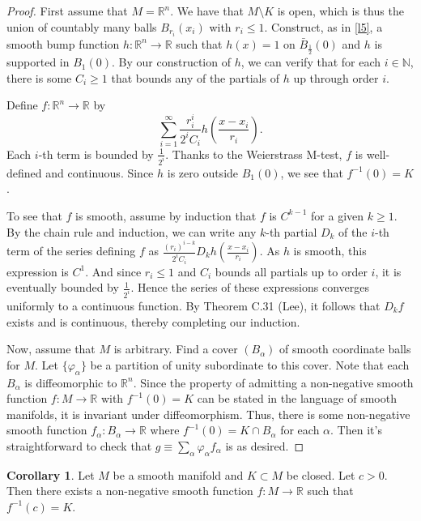 \documentclass[10pt,letterpaper,cm]{nupset}
\theoremstyle{definition}
\theoremstyle{theorem}
\newtheorem{corollary}[definition]{Corollary}
\theoremstyle{remark}
\newcommand{\N}{\mathbb N}
\newcommand{\R}{\mathbb R}
\newcommand{\1}{\mathbf{1}}
\newcommand{\0}{\vec 0}
\begin{document}
\begin{proof}
First assume that $M=\R^n$. We have that $M\setminus K$ is open, which is thus the union of countably many balls $B_{r_i}(x_i)$ with $r_i \leq 1$. Construct, as in \cref{l5}, a smooth bump function $h: \R^n \to \R$ such that
 $h(x) =1$ on $\bar{B}_{\frac{1}{2}}(0)$ and  $h$ is supported in $B_1(0)$.  By our construction of $h$, we can verify that for each $i\in \N$, there is some $C_i \geq 1$ that bounds any of the partials of $h$ up through order $i$. 

 Define $f: \R^n \to \R$ by $$\sum_{i=1}^\infty \frac{r_i^i}{2^iC_i}h \left(\frac{x-x_i}{r_i}\right).$$ Each $i$-th term is bounded by $\frac{1}{2^i}$. Thanks to the Weierstrass M-test, $f$ is well-defined and continuous. Since $h$ is zero outside $B_1(0)$, we see that $f^{-1}(0) = K$. 
 
 To see that $f$ is smooth, assume by induction that $f$ is $C^{k-1}$ for a given $k \geq 1$. By the chain rule and induction, we can write any $k$-th partial $D_k$ of the $i$-th term of the series defining $f$ as $\frac{(r_i)^{i-k}}{2^iC_i} D_kh(\frac{x-x_i}{r_i})$. As $h$ is smooth, this expression is $C^1$. And since $r_i \leq 1$ and $C_i$ bounds all partials up to order $i$, it is eventually bounded by $\frac{1}{2^i}$. Hence the series of these expressions converges uniformly to a continuous function. By Theorem C.31 (Lee), it follows that $D_kf$ exists and is continuous, thereby completing our induction. 

 Now, assume that $M$ is arbitrary. Find a cover $(B_\alpha)$ of smooth coordinate balls for $M$. Let $\{\varphi_\alpha\}$ be a partition of unity subordinate to this cover. Note that each $B_\alpha$ is diffeomorphic to $\R^n$. Since the property of admitting a non-negative smooth function $f: M \to \R$ with $f^{-1}(0) = K$ can be stated in the language of smooth manifolds, it is invariant under diffeomorphism. Thus, there is some non-negative smooth function $f_\alpha : B_\alpha \to \R$ where $f^{-1}(0) = K \cap B_\alpha$ for each $\alpha$. Then it's straightforward to check that $g \equiv \sum_{\alpha} \varphi_\alpha f_\alpha$ is as desired.
\end{proof}

\begin{corollary}
Let $M$ be a smooth manifold and $K \subset M$ be closed. Let $c >0$. Then there exists a non-negative smooth function $f: M \to \R$ such that $f^{-1}(c) =K$.
\end{corollary}
\end{document}
